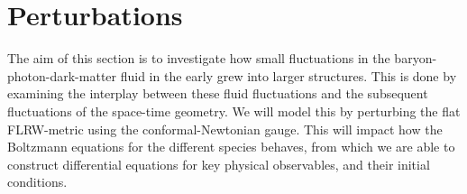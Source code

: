 \section{Perturbations}\label{sec:m3}

The aim of this section is to investigate how small fluctuations in the baryon-photon-dark-matter fluid in the early grew into larger structures. This is done by examining the interplay between these fluid fluctuations and the subsequent fluctuations of the space-time geometry. We will model this by perturbing the flat FLRW-metric using the conformal-Newtonian gauge. This will impact how the Boltzmann equations for the different species behaves, from which we are able to construct differential equations for key physical observables, and their initial conditions. 



